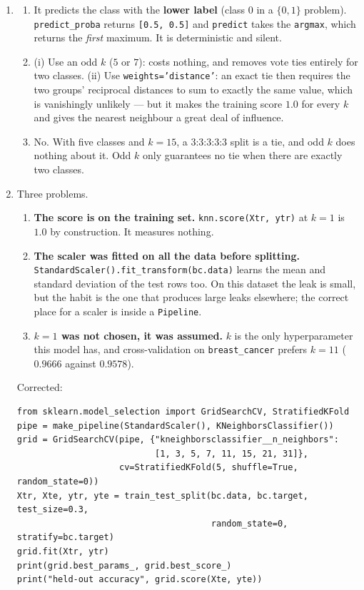 \documentclass[11pt]{article}
\begin{document}
\begin{enumerate}[leftmargin=*, itemsep=0.7em]
\item
  \begin{enumerate}[label=(\alph*)]
    \item It predicts the class with the \textbf{lower label} (class $0$ in a
      $\{0,1\}$ problem). \texttt{predict\_proba} returns
      \texttt{[0.5, 0.5]} and \texttt{predict} takes the \texttt{argmax}, which
      returns the \emph{first} maximum. It is deterministic and silent.
    \item (i) Use an odd $k$ ($5$ or $7$): costs nothing, and removes vote ties
      entirely for two classes. (ii) Use \texttt{weights='distance'}: an exact
      tie then requires the two groups' reciprocal distances to sum to exactly
      the same value, which is vanishingly unlikely --- but it makes the training
      score $1.0$ for every $k$ and gives the nearest neighbour a great deal of
      influence.
    \item No. With five classes and $k = 15$, a $3$:$3$:$3$:$3$:$3$ split is a
      tie, and odd $k$ does nothing about it. Odd $k$ only guarantees no tie
      when there are exactly two classes.
  \end{enumerate}

\item Three problems.

  \begin{enumerate}[label=(\roman*)]
    \item \textbf{The score is on the training set.} \texttt{knn.score(Xtr,
      ytr)} at $k=1$ is $1.0$ by construction. It measures nothing.
    \item \textbf{The scaler was fitted on all the data before splitting.}
      \texttt{StandardScaler().fit\_transform(bc.data)} learns the mean and
      standard deviation of the test rows too. On this dataset the leak is
      small, but the habit is the one that produces large leaks elsewhere; the
      correct place for a scaler is inside a \texttt{Pipeline}.
    \item \textbf{$k=1$ was not chosen, it was assumed.} $k$ is the only
      hyperparameter this model has, and cross-validation on
      \texttt{breast\_cancer} prefers $k=11$ ($0.9666$ against $0.9578$).
  \end{enumerate}

  Corrected:

\begin{lstlisting}
from sklearn.model_selection import GridSearchCV, StratifiedKFold
pipe = make_pipeline(StandardScaler(), KNeighborsClassifier())
grid = GridSearchCV(pipe, {"kneighborsclassifier__n_neighbors":
                           [1, 3, 5, 7, 11, 15, 21, 31]},
                    cv=StratifiedKFold(5, shuffle=True, random_state=0))
Xtr, Xte, ytr, yte = train_test_split(bc.data, bc.target, test_size=0.3,
                                      random_state=0, stratify=bc.target)
grid.fit(Xtr, ytr)
print(grid.best_params_, grid.best_score_)
print("held-out accuracy", grid.score(Xte, yte))
\end{lstlisting}


\end{enumerate}
\end{document}
